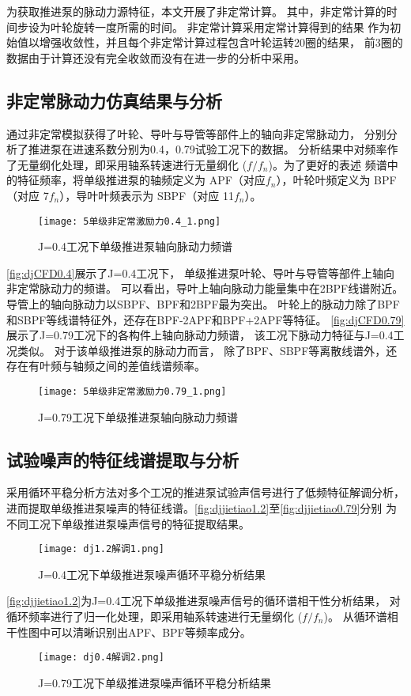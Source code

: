 为获取推进泵的脉动力源特征，本文开展了非定常计算。
其中，非定常计算的时间步设为叶轮旋转一度所需的时间。
非定常计算采用定常计算得到的结果
作为初始值以增强收敛性，并且每个非定常计算过程包含叶轮运转20圈的结果，
前3圈的数据由于计算还没有完全收敛而没有在进一步的分析中采用。
\subsection{非定常脉动力仿真结果与分析}
通过非定常模拟获得了叶轮、导叶与导管等部件上的轴向非定常脉动力，
分别分析了推进泵在进速系数分别为0.4，0.79试验工况下的数据。
分析结果中对频率作了无量纲化处理，即采用轴系转速进行无量纲化 ($f/f_n$)。为了更好的表述
频谱中的特征频率，将单级推进泵的轴频定义为 APF（对应$f_n$），叶轮叶频定义为 BPF
（对应 7$f_n$），导叶叶频表示为 SBPF（对应 11$f_n$）。
\begin{figure}[htbp]
    \centering
    \texttt{[image: 5单级非定常激励力0.4\_1.png]}
    \caption{\label{fig:djCFD0.4}J=0.4工况下单级推进泵轴向脉动力频谱}
\end{figure}

\autoref{fig:djCFD0.4}展示了J=0.4工况下，
单级推进泵叶轮、导叶与导管等部件上轴向非定常脉动力的频谱。
可以看出，导叶上轴向脉动力能量集中在2BPF线谱附近。
导管上的轴向脉动力以SBPF、BPF和2BPF最为突出。
叶轮上的脉动力除了BPF和SBPF等线谱特征外，还存在BPF-2APF和BPF+2APF等特征。
\autoref{fig:djCFD0.79}展示了J=0.79工况下的各构件上轴向脉动力频谱，
该工况下脉动力特征与J=0.4工况类似。
对于该单级推进泵的脉动力而言，
除了BPF、SBPF等离散线谱外，还存在有叶频与轴频之间的差值线谱频率。
\begin{figure}[htbp]
    \centering
    \texttt{[image: 5单级非定常激励力0.79\_1.png]}
    \caption{\label{fig:djCFD0.79}J=0.79工况下单级推进泵轴向脉动力频谱}
\end{figure}
\subsection{试验噪声的特征线谱提取与分析}
采用循环平稳分析方法对多个工况的推进泵试验声信号进行了低频特征解调分析，
进而提取单级推进泵噪声的特征线谱。\autoref{fig:djjietiao1.2}至\autoref{fig:djjietiao0.79}分别
为不同工况下单级推进泵噪声信号的特征提取结果。
\begin{figure}[htbp]
    \centering
    \texttt{[image: dj1.2解调1.png]}
    \caption{\label{fig:djjietiao1.2}J=0.4工况下单级推进泵噪声循环平稳分析结果}
\end{figure}

\autoref{fig:djjietiao1.2}为J=0.4工况下单级推进泵噪声信号的循环谱相干性分析结果，
对循环频率进行了归一化处理，即采用轴系转速进行无量纲化 ($f/f_n$)。
从循环谱相干性图中可以清晰识别出APF、BPF等频率成分。
\begin{figure}[htbp]
    \centering
    \texttt{[image: dj0.4解调2.png]}
    \caption{\label{fig:djjietiao0.4}J=0.79工况下单级推进泵噪声循环平稳分析结果}
\end{figure}

